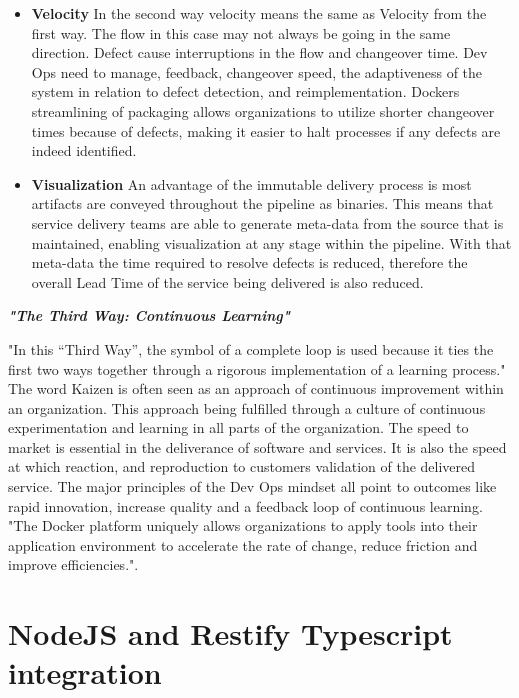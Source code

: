 \begin{itemize}
\item \textbf{Velocity}
	In the second way velocity means the same as Velocity from the first way. The flow in this case may not always be going in the same direction. Defect cause interruptions in the flow and changeover time. Dev Ops need to manage, feedback, changeover speed, the adaptiveness of the system in relation to defect detection, and reimplementation. Dockers streamlining of packaging allows organizations to utilize shorter changeover times because of defects, making it easier to halt processes if any defects are indeed identified.\cite{willis}
    \item \textbf{Visualization}
    An advantage of the immutable delivery process is most artifacts are conveyed throughout the pipeline as binaries\cite{willis}. This means that service delivery teams are able to generate meta-data from the source that is maintained, enabling visualization at any stage within the pipeline. With that meta-data the time required to resolve defects is reduced, therefore the overall Lead Time of the service being delivered is also reduced. 
\end{itemize}

\textbf{\emph{"The Third Way: Continuous Learning"}}

"In this “Third Way”, the symbol of a complete loop is used because it ties the first two ways together through a rigorous implementation of a learning process."\cite{willis}
The word Kaizen is often seen as an approach of continuous improvement within an organization. This approach being fulfilled through a culture of continuous experimentation and learning in all parts of the organization\cite{willis}. The speed to market is essential in the deliverance of software and services. It is also the speed at which reaction, and reproduction to customers validation of the delivered service. 
The major principles of the Dev Ops mindset all point to outcomes like rapid innovation, increase quality and a feedback loop of continuous learning. "The Docker platform uniquely allows organizations to apply tools into their application environment to accelerate the rate of change, reduce friction and improve efficiencies."\cite{willis}.

\section{NodeJS and Restify Typescript integration}






